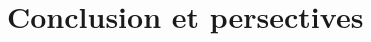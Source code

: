 \documentclass[logos,chaptertoc]{bordeaux-thesis}
\begin{document}
\chapter{Conclusion et persectives}\label{sec:discussion}



\adjustmtc %


\appendix








\end{document}
